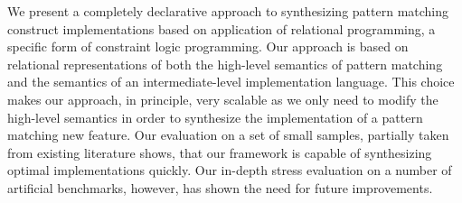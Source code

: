 We present a completely declarative approach to synthesizing pattern matching construct implementations based on
application of relational programming, a specific form of constraint logic programming. Our approach is based on
relational representations of both the high-level semantics of pattern matching and the semantics of
an intermediate-level implementation language. This choice makes our approach, in principle, very scalable as we only
need to modify the high-level semantics in order to synthesize the implementation of a pattern matching new feature.
Our evaluation on a set of small samples, partially taken from existing literature shows, that our framework is capable
of synthesizing optimal implementations quickly. Our in-depth stress evaluation on a number of artificial benchmarks,
however, has shown the need for future improvements.

